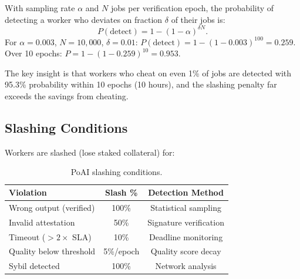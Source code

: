 \begin{theorem}
\label{thm:detection}
With sampling rate $\alpha$ and $N$ jobs per verification epoch, the probability of detecting a worker who deviates on fraction $\delta$ of their jobs is:
\begin{equation}
P(\text{detect}) = 1 - (1 - \alpha)^{\delta N}.
\end{equation}
For $\alpha = 0.003$, $N = 10{,}000$, $\delta = 0.01$: $P(\text{detect}) = 1 - (1-0.003)^{100} = 0.259$. Over 10 epochs: $P = 1 - (1-0.259)^{10} = 0.953$.
\end{theorem}

The key insight is that workers who cheat on even 1\% of jobs are detected with 95.3\% probability within 10 epochs (10 hours), and the slashing penalty far exceeds the savings from cheating.

\subsection{Slashing Conditions}

Workers are slashed (lose staked collateral) for:

\begin{table}[H]
\centering
\small
\begin{tabular}{lcc}
\toprule
\textbf{Violation} & \textbf{Slash \%} & \textbf{Detection Method} \\
\midrule
Wrong output (verified) & 100\% & Statistical sampling \\
Invalid attestation & 50\% & Signature verification \\
Timeout ($> 2\times$ SLA) & 10\% & Deadline monitoring \\
Quality below threshold & 5\%/epoch & Quality score decay \\
Sybil detected & 100\% & Network analysis \\
\bottomrule
\end{tabular}
\caption{PoAI slashing conditions.}
\label{tab:slashing}
\end{table}

